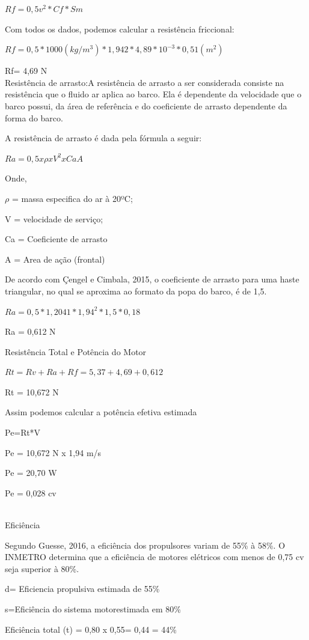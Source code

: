 $Rf = 0,5 v^{2} * Cf * Sm$

Com todos os dados, podemos calcular a resistência friccional:
  
$Rf=0,5 * 1000 (kg/m^{3}) * 1,942* 4,89 * 10^{-3} * 0,51 (m^{2})$

Rf= 4,69 N  \\


Resistência de arrasto:A resistência de arrasto a ser considerada consiste na resistência que o fluido ar aplica ao barco. Ela é dependente da velocidade que o barco possui, da área de referência e do coeficiente de arrasto dependente da forma do barco.

A resistência de arrasto é dada pela fórmula a seguir:

$Ra = 0,5 x \rho x V^{2} x Ca A$

Onde, 

$\rho$ = massa especifica do ar à 20ºC;

V = velocidade de serviço;

Ca = Coeficiente de arrasto

A = Area de ação (frontal)

De acordo com Çengel e Cimbala, 2015, o coeficiente de arrasto  para uma haste triangular, no qual se aproxima ao formato da popa do barco, é de 1,5.

$Ra = 0,5 * 1,2041 * 1,94^{2} * 1,5 * 0,18$

Ra = 0,612 N 

Resistência Total e Potência do Motor

$Rt=Rv+Ra + Rf = 5,37 + 4,69 + 0,612$

Rt = 10,672 N

Assim podemos calcular a potência efetiva estimada

Pe=Rt*V

Pe = 10,672 N x 1,94 m/s 

Pe = 20,70 W

Pe = 0,028 cv

\\

Eficiência

Segundo Guesse, 2016, a eficiência dos propulsores variam de 55\% à 58\%. O INMETRO determina que a eficiência de motores elétricos com menos de 0,75 cv seja superior à 80\%.

d= Eficiencia propulsiva estimada de 55\%

s=Eficiência do sistema motorestimada em 80\%

Eficiência total (t) = 0,80 x 0,55= 0,44 = 44\%


